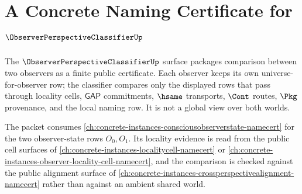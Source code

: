 \chapter{A Concrete Naming Certificate for $\ObserverPerspectiveClassifierUp$}
\label{ch:concrete-instances-observerperspectiveclassifier-namecert}

The $\ObserverPerspectiveClassifierUp$ surface packages comparison between two observers as a finite public certificate. Each observer keeps its own universe-for-observer row; the classifier compares only the displayed rows that pass through locality cells, $\mathsf{GAP}$ commitments, $\hsame$ transports, $\Cont$ routes, $\Pkg$ provenance, and the local naming row. It is not a global view over both worlds.

The packet consumes \autoref{ch:concrete-instances-consciousobserverstate-namecert} for the two observer-state rows $O_0,O_1$. Its locality evidence is read from the public cell surfaces of \autoref{ch:concrete-instances-localitycell-namecert} or \autoref{ch:concrete-instances-observer-locality-cell-namecert}, and the comparison is checked against the public alignment surface of \autoref{ch:concrete-instances-crossperspectivealignment-namecert} rather than against an ambient shared world.


